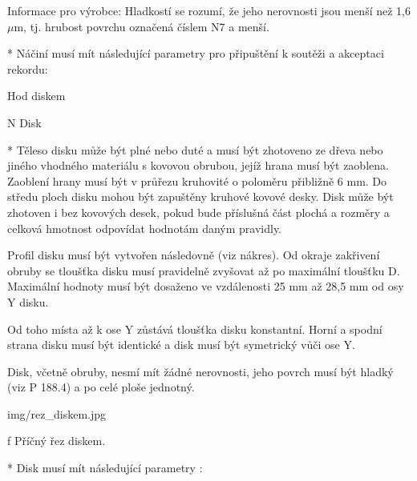 Informace pro výrobce: Hladkostí se rozumí, že jeho nerovnosti jsou menší než 1,6 $\mu$m, tj. hrubost povrchu označená číslem N7 a menší.

* Náčiní musí mít následující parametry pro připuštění k soutěži a akceptaci rekordu:

\enditems

\secc Hod diskem

\begitems \style N
Disk

* Těleso disku může být plné nebo duté a musí být zhotoveno ze dřeva nebo jiného vhodného materiálu s kovovou obrubou, jejíž hrana musí být zaoblena. Zaoblení hrany musí být v průřezu kruhovité o poloměru přibližně 6 mm. Do středu ploch disku mohou být zapuštěny kruhové kovové desky. Disk může být zhotoven i bez kovových desek, pokud bude příslušná část plochá a rozměry a celková hmotnost odpovídat hodnotám daným pravidly.

Profil disku musí být vytvořen následovně (viz nákres). Od okraje zakřivení obruby se tloušťka disku musí pravidelně zvyšovat až po maximální tloušťku D. Maximální hodnoty musí být dosaženo ve vzdálenosti 25 mm až 28,5 mm od osy Y disku.

Od toho místa až k ose Y zůstává tloušťka disku konstantní. Horní a spodní strana disku musí být identické a disk musí být symetrický vůči ose Y.

Disk, včetně obruby, nesmí mít žádné nerovnosti, jeho povrch musí být hladký (viz P 188.4) a po celé ploše jednotný.

\picw=8cm \inspic img/rez_diskem.jpg
\caption/f Příčný řez diskem.

* Disk musí mít následující parametry :

